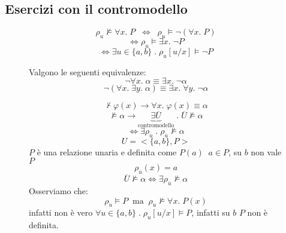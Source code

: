 \documentclass{article}
\theoremstyle{break}
\theoremstyle{break}
\theoremstyle{break}
\theoremstyle{break}
\begin{document}
\subsection{Esercizi con il contromodello}
\begin{figure}[H]
  \begin{definition}
    \[
    \rho_u \not\models \forall x.\; P \;\; \Leftrightarrow\;\; \rho_u \models \neg (\forall x.\; P)
    \] 
    \[
    \Leftrightarrow \rho_u \models \exists x.\; \neg P
    \] 
    \[
    \Leftrightarrow \exists u \in \{a,b\} \;.\; \rho_u[u/x] \models \neg P
    \] 

    Valgono le seguenti equivalenze:
    \[
    \neg \forall x.\; \alpha \equiv \exists x.\; \neg \alpha
    \] 
    \[
    \neg (\forall x.\; \exists y.\; \alpha) \equiv \exists x.\; \forall y.\; \neg \alpha
    \] 
  \end{definition}
\end{figure}
\begin{figure}[H]
  \begin{exercise}
    \[
    \not\vdash \varphi(x) \to \forall x.\; \varphi(x) \equiv \alpha
    \] 
    \[
      \not\models \alpha \to \underbrace{\exists \overline{U}}_{\text{contromodello}} \;.\; \overline{U} \not\models \alpha
    \] 
    \[
    \Leftrightarrow \exists \rho_{\overline{u}} \;.\; \rho_{\overline{u}} \not\models \alpha
    \] 
    \[
    U = <\{a,b\}, P>
    \] 
    \( P \) è una relazione unaria e definita come \( P(a) \;\; a \in P \), su \( b \) non vale \( P \) 
    \[
      \rho_{\overline{u}}(x) = a
    \] 
    \[
      \overline{U} \not\models \alpha \Leftrightarrow \exists \rho_{\overline{u}} \not\models \alpha
    \] 
    Osserviamo che:
    \[
    \rho_u \models P \;\;\text{ma} \;\; \rho_u \not\models \forall x.\; P(x) 
    \] 
    infatti non è vero \( \forall u \in \{a,b\} \;.\; \rho_u[u/x] \models P \), infatti su \( b \) 
    \( P \) non è definita.
  \end{exercise}
\end{figure}
\end{document}
